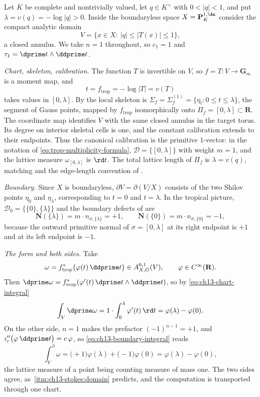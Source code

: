 \begin{example}
\label{ex:ch13-stokes-annulus}
Let $K$ be complete and nontrivially valued, let $q\in K^\times$ with
$0<|q|<1$, and put $\lambda=v(q)=-\log|q|>0$.  Inside the boundaryless space
$X=\mathbf P^{1,\An}_K$ consider the compact analytic domain
\[
 V=\{x\in X:\ |q|\le|T(x)|\le1\},
\]
a closed annulus.  We take $n=1$ throughout, so $c_1=1$ and
$\tau_1=\dprime t\wedge\ddprime t$.

\emph{Chart, skeleton, calibration.}  The function $T$ is invertible on $V$,
so $f=T:V\to\mathbf G_m$ is a moment map, and
\[
 t=f_{\mathrm{trop}}=-\log|T|=v(T)
\]
takes values in $[0,\lambda]$.  By  the local
skeleton is $\Sigma_f=\Sigma_f^{(1)}=\{\eta_t:0\le t\le\lambda\}$, the
segment of Gauss points, mapped by $f_{\mathrm{trop}}$ isomorphically onto
$\Pi_f=[0,\lambda]\subset\mathbf R$.  The coordinate map identifies
$V$ with the same closed annulus in the target torus.  Its degree on
interior skeletal cells is one, and the constant calibration extends
to their endpoints.  Thus the canonical calibration is the primitive
$1$-vector: in the notation
of \eqref{eq:trop-multiplicity-formula}, $\mathscr D=\{[0,\lambda]\}$ with
weight $m=1$, and the lattice measure $\omega_{[0,\lambda]}$ is $\rd t$.
The total lattice length of $\Pi_f$ is $\lambda=v(q)$, matching
 and the edge-length convention of
.

\emph{Boundary.}  Since $X$ is boundaryless,
$\partial V=\partial(V/X)$ consists of the two Shilov points $\eta_0$ and
$\eta_\lambda$, corresponding to $t=0$ and $t=\lambda$.  In the tropical
picture, $\mathscr D_0=\{\{0\},\{\lambda\}\}$ and the boundary defects of
 are
\[
 \mathbf N(\{\lambda\})=m\cdot n_{\sigma,\{\lambda\}}=+1,
 \qquad
 \mathbf N(\{0\})=m\cdot n_{\sigma,\{0\}}=-1,
\]
because the outward primitive normal of $\sigma=[0,\lambda]$ at its right
endpoint is $+1$ and at its left endpoint is $-1$.

\emph{The form and both sides.}  Take
\[
 \omega=f_{\mathrm{trop}}^*\bigl(\varphi(t)\,\ddprime t\bigr)
 \in A^{0,1}_{X,G}(V),
 \qquad \varphi\in C^\infty(\mathbf R).
\]
Then $\dprime\omega=f_{\mathrm{trop}}^*(\varphi'(t)\,\dprime t\wedge\ddprime t)$,
so by \eqref{eq:ch13-chart-integral}
\[
 \int_V\dprime\omega
 =1\cdot\int_0^\lambda\varphi'(t)\,\rd t
 =\varphi(\lambda)-\varphi(0).
\]
On the other side, $n=1$ makes the prefactor $(-1)^{n-1}=+1$, and
$\iota''_{c}\bigl(\varphi\,\ddprime t\bigr)=c\,\varphi$, so
\eqref{eq:ch13-boundary-integral} reads
\[
 \int_V^\partial\omega
 =\bigl(+1\bigr)\varphi(\lambda)+\bigl(-1\bigr)\varphi(0)
 =\varphi(\lambda)-\varphi(0),
\]
the lattice measure of a point being counting measure of mass one.  The two
sides agree, as \,\cref{itm:ch13-stokes:domain}
predicts, and the computation is  transported
through one chart.


\end{example}
